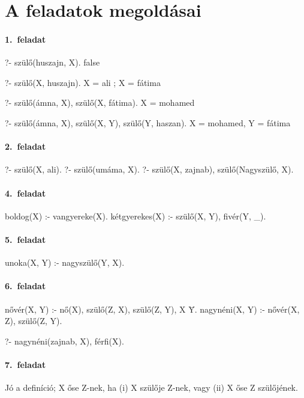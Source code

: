 
\chapter{A feladatok megoldásai}
\subsubsection*{1.~feladat}
\begin{query}
?- szülő(huszajn, X).
false

?- szülő(X, huszajn).
X = ali ;
X = fátima

?- szülő(ámna, X), szülő(X, fátima).
X = mohamed

?- szülő(ámna, X), szülő(X, Y), szülő(Y, haszan).
X = mohamed,
Y = fátima
\end{query}
\subsubsection*{2.~feladat}
\begin{query}
?- szülő(X, ali).
?- szülő(umáma, X).
?- szülő(X, zajnab), szülő(Nagyszülő, X).
\end{query}
\subsubsection*{4.~feladat}
\begin{program}
boldog(X) :- vangyereke(X).
kétgyerekes(X) :- szülő(X, Y), fivér(Y, _).
\end{program}
\subsubsection*{5.~feladat}
\begin{program}
unoka(X, Y) :- nagyszülő(Y, X).
\end{program}
\subsubsection*{6.~feladat}
\begin{program}
nővér(X, Y) :-
    nő(X),
    szülő(Z, X), szülő(Z, Y),
    X \= Y.
nagynéni(X, Y) :- nővér(X, Z), szülő(Z, Y).
\end{program}
\begin{query}
?- nagynéni(zajnab, X), férfi(X).
\end{query}
\subsubsection*{7.~feladat}
Jó a definíció; X őse Z-nek, ha (i) X szülője Z-nek, vagy (ii) X őse Z szülőjének.
